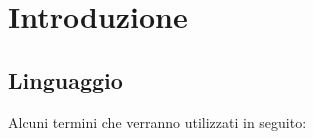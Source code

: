 
\newpage
\section{Introduzione}


\subsection{Linguaggio}
Alcuni termini che verranno utilizzati in seguito:
